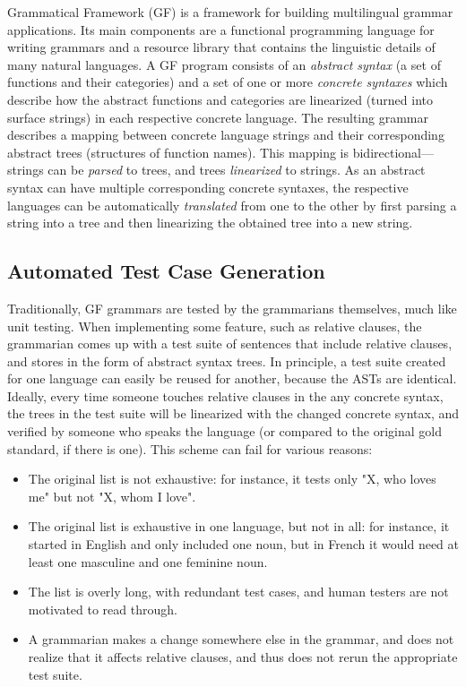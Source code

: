 \documentclass[conference]{IEEEtran}
\begin{document}
Grammatical Framework (GF) \cite{ranta2011gfbook} 
is a framework for building multilingual grammar applications. Its main
components are a functional programming language for writing grammars
and a resource library that contains the linguistic details of many
natural languages.
A GF program consists of an \emph{abstract syntax} (a set of functions
and their categories) and a set of one or more
\emph{concrete syntaxes} which describe how the abstract
functions and categories are linearized (turned into surface strings) in each
respective concrete language. The resulting grammar
describes a mapping between concrete language strings and
their corresponding abstract trees (structures of function names).
This mapping is bidirectional---strings can be \emph{parsed} to
trees, and trees \emph{linearized} to strings.
As an abstract syntax can have multiple corresponding concrete syntaxes,
the respective
languages can be automatically \emph{translated} from one to the other by
first parsing a string into a tree and then linearizing the obtained tree
into a new string.


\subsection{Automated Test Case Generation}

Traditionally, GF grammars are tested by the grammarians themselves,
much like unit testing. %
When implementing some feature, such as relative clauses, the grammarian
comes up with a test suite of sentences that include relative clauses, 
and stores in the form of abstract syntax trees. In principle, a test suite created for one
language can easily be reused for another, because the ASTs are identical.
Ideally, every time someone touches relative clauses in the any concrete syntax, the trees 
in the test suite will be linearized with the changed concrete syntax, and verified by 
someone who speaks the language (or compared to the original gold standard, if there is one).
This scheme can fail for various reasons:

\begin{itemize}
\item The original list is not exhaustive: for instance, it tests only "X, who loves me" but not "X, whom I love".
\item The original list is exhaustive in one language, but not in all: for instance, it started in English and only included one noun, but in French it would need at least one masculine and one feminine noun.
\item The list is overly long, with redundant test cases, and human testers are not motivated to read through.
\item A grammarian makes a change somewhere else in the grammar, and does not realize that it affects relative clauses, and thus does not rerun the appropriate test suite.
\end{itemize}
\end{document}
